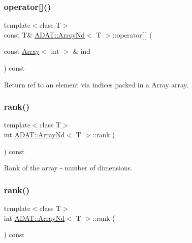 \subsubsection{\texorpdfstring{operator[]()}{operator[]()}\hspace{0.1cm}{\footnotesize\ttfamily [6/6]}}
{\footnotesize\ttfamily template$<$class T$>$ \\
const T\& \mbox{\hyperlink{classADAT_1_1ArrayNd}{A\+D\+A\+T\+::\+Array\+Nd}}$<$ T $>$\+::operator\mbox{[}$\,$\mbox{]} (\begin{DoxyParamCaption}\item[{const \mbox{\hyperlink{classXMLArray_1_1Array}{Array}}$<$ int $>$ \&}]{ind }\end{DoxyParamCaption}) const\hspace{0.3cm}{\ttfamily [inline]}}



Return ref to an element via indices packed in a Array array. 

\mbox{\label{classADAT_1_1ArrayNd_a3f681a80aee7e76cc959431f45d931f8}} 
\subsubsection{\texorpdfstring{rank()}{rank()}\hspace{0.1cm}{\footnotesize\ttfamily [1/3]}}
{\footnotesize\ttfamily template$<$class T$>$ \\
int \mbox{\hyperlink{classADAT_1_1ArrayNd}{A\+D\+A\+T\+::\+Array\+Nd}}$<$ T $>$\+::rank (\begin{DoxyParamCaption}{ }\end{DoxyParamCaption}) const\hspace{0.3cm}{\ttfamily [inline]}}



Rank of the array -\/ number of dimensions. 

\mbox{\label{classADAT_1_1ArrayNd_a3f681a80aee7e76cc959431f45d931f8}} 
\subsubsection{\texorpdfstring{rank()}{rank()}\hspace{0.1cm}{\footnotesize\ttfamily [2/3]}}
{\footnotesize\ttfamily template$<$class T$>$ \\
int \mbox{\hyperlink{classADAT_1_1ArrayNd}{A\+D\+A\+T\+::\+Array\+Nd}}$<$ T $>$\+::rank (\begin{DoxyParamCaption}{ }\end{DoxyParamCaption}) const\hspace{0.3cm}{\ttfamily [inline]}}




